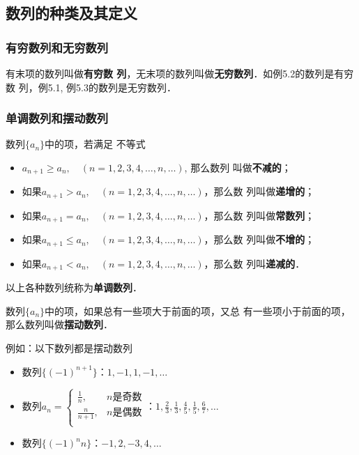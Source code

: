 \subsection{数列的种类及其定义}
\subsubsection{有穷数列和无穷数列}

有末项的数列叫做\textbf{有穷数
列}，无末项的数列叫做\textbf{无穷数列}．如例5.2的数列是有穷数
列，例5.1, 例5.3的数列是无穷数列．


\subsubsection{单调数列和摆动数列}

数列$\{a_n\}$中的项，若满足
不等式
\begin{itemize}
    \item $a_{n+1}\ge a_n,\quad (n=1,2,3,4,\ldots,n,\ldots)$, 那么数列
叫做\textbf{不减的}； 
\item 如果$a_{n+1}> a_n,\quad (n=1,2,3,4,\ldots,n,\ldots)$，那么数
列叫做\textbf{递增的}；
\item 如果$a_{n+1}= a_n,\quad (n=1,2,3,4,\ldots,n,\ldots)$，那么数
列叫做\textbf{常数列}；
\item 如果$a_{n+1}\le a_n,\quad (n=1,2,3,4,\ldots,n,\ldots)$，那么数
列叫做\textbf{不增的}；
\item 如果$a_{n+1}< a_n,\quad (n=1,2,3,4,\ldots,n,\ldots)$，那么数
列叫\textbf{递减的}．
\end{itemize}

以上各种数列统称为\textbf{单调数列}．

数列$\{a_n\}$中的项，如果总有一些项大于前面的项，又总
有一些项小于前面的项，那么数列叫做\textbf{摆动数列}．

例如：以下数列都是摆动数列
\begin{itemize}
    \item 数列$\{(-1)^{n+1}\}$：$1,-1,1,-1,\ldots$
    \item 数列$a_n=\begin{cases}
        \frac{1}{n}, & \text{$n$是奇数}\\
        \frac{n}{n+1}, & \text{$n$是偶数}\\
    \end{cases}$：$1,\frac{2}{3},\frac{1}{3},\frac{4}{5},\frac{1}{5},\frac{6}{7},\ldots$
    \item 数列$\{(-1)^{n}n\}$：$-1,2,-3,4,\ldots$
\end{itemize}

